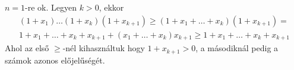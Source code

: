 $n=1$-re ok. 
Legyen $k>0$, ekkor
\begin{align*}
	(1+x_{1})\hdots (1+x_{k})(1+x_{k+1}) \ge
	(1 + x_{1}+\hdots +x_{k})(1+x_{k+1}) =\\
	1 + x_{1}+\hdots +x_{k} +x_{k+1} + (x_{1}+\hdots +x_{k})x_{k+1} \ge
	1 + x_{1}+\hdots +x_{k} +x_{k+1}
\end{align*}
Ahol az első $\ge$-nél kihasználtuk hogy $1+x_{k+1}>0$, a másodiknál pedig a számok azonos
előjelűségét.
